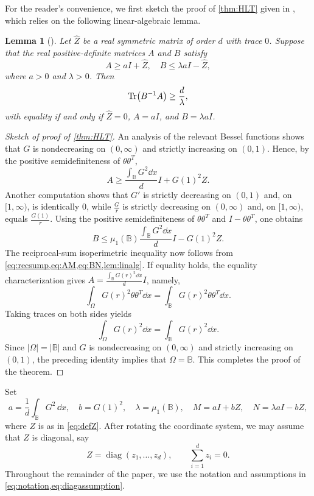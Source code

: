 \documentclass{amsart}
\numberwithin{equation}{section}
\theoremstyle{plain}
\newtheorem{lemma}[theorem]{Lemma}
\theoremstyle{definition}
\theoremstyle{plain}
\theoremstyle{remark}
\numberwithin{figure}{section}
\DeclareMathOperator{\diag}{diag}
\newcommand{\B}{\mathbb{B}}
\begin{document}
For the reader’s convenience, we first sketch the proof of \cref{thm:HLT} given in {\cite{HLT26+}}, which relies on the following linear-algebraic lemma.
\begin{lemma}[{\cite[Lemma 2.2]{HLT26+}}]
    \label{lem:linalg}
    Let $\widehat{Z}$ be a real symmetric matrix of order $d$ with trace $0$. Suppose that the real positive-definite matrices $A$ and $B$ satisfy
    \[
        A\geq  aI+ \widehat{Z},\quad B\leq \lambda aI- \widehat{Z},
    \]
    where $a>0$  and $\lambda>0$. Then
    \begin{equation*}
        \Tr(B^{-1}A) \geq \frac{d}{\lambda},
    \end{equation*}
   with equality if and only if $\widehat{Z}=0$, $A=aI$, and $B=\lambda aI$.
\end{lemma}

\begin{proof}[Sketch of proof of \cref{thm:HLT}]
An analysis of the relevant Bessel functions shows that $G$ is nondecreasing on $(0,\infty)$ and strictly increasing on $(0,1)$. Hence, by the positive semidefiniteness of $\theta\theta^T$,
\begin{equation}
    \label{eq:AM}
    A\geq \frac{\int_{\B}G^2 \dd x}{d}I + G(1)^2Z.
\end{equation}
Another computation shows that $G'$ is strictly decreasing on $(0,1)$ and, on $[1,\infty)$, is identically $0$, while $\frac{G}{r}$ is strictly decreasing on $(0,\infty)$ and, on $[1,\infty)$, equals $\frac{G(1)}{r}$. Using the positive semidefiniteness of $\theta\theta^T$ and $I-\theta\theta^T$, one obtains
\begin{equation}
    \label{eq:BN}
    B\leq \mu_1(\B)\frac{\int_{\B}G^2 \dd x}{d}I - G(1)^2Z.
\end{equation}
The reciprocal-sum isoperimetric inequality now follows from \cref{eq:recsump,eq:AM,eq:BN,lem:linalg}. If equality holds, the equality characterization gives $A=\frac{\int_{\B}G(r)^2\dd x}{d}I$, namely,
\[
    \int_{\Omega} G(r)^2\theta\theta^T \dd x = \int_{\B}G(r)^2\theta\theta^T \dd x.
\]
Taking traces on both sides yields
\[
    \int_{\Omega}G(r)^2\dd x = \int_{\B}G(r)^2\dd x.
\]
Since $|\Omega|=|\B|$  and   $G$ is nondecreasing on $(0,\infty)$ and strictly increasing on $(0,1)$, the preceding identity implies that $\Omega = \B$. This completes the proof of the theorem.
\end{proof}

Set
\begin{equation}
    \label{eq:notation}
    a=\frac{1}{d}\int_{\B}G^2\,\dd x,\quad b=G(1)^2, \quad \lambda = \mu_1(\B), \quad M=aI+bZ, \quad N=\lambda aI-bZ,
\end{equation}
where $Z$ is as in \cref{eq:defZ}. After rotating the coordinate system, we may assume that $Z$ is diagonal, say
\begin{equation}
    \label{eq:diagassumption}
    Z=\diag(z_1,\dots,z_d), \qquad \sum_{i=1}^d z_i=0.
\end{equation}
Throughout the remainder of the paper, we use the notation and assumptions in \cref{eq:notation,eq:diagassumption}.
\end{document}
